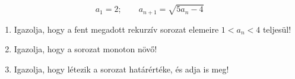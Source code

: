\documentclass[11pt]{scrartcl}
\begin{document}
\[
	a_1 = 2; \qquad a_{n + 1} = \sqrt{5a_n - 4}
\]
\begin{enumerate}
	\item Igazolja, hogy a fent megadott rekurzív sorozat elemeire
	      $1 < a_n < 4$ teljesül!

	\item Igazolja, hogy a sorozat monoton növő!

	\item Igazolja, hogy létezik a sorozat határértéke, és adja is meg!
\end{enumerate}
\end{document}
